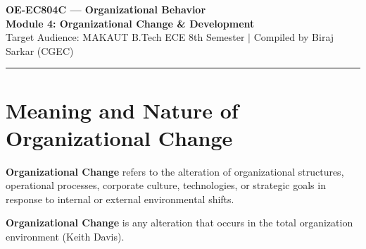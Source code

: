 \documentclass[11pt,a4paper]{article}
\begin{document}
\begin{center}
  {\LARGE \bfseries \color{myred} OE-EC804C --- Organizational Behavior}\\[6pt]
  {\Large \bfseries \color{myteal} Module 4: Organizational Change \& Development}\\[4pt]
  {\small \color{mydark} Target Audience: MAKAUT B.Tech ECE 8th Semester $|$ Compiled by Biraj Sarkar (CGEC)}
\end{center}
\vspace{-6pt}
\hrule
\vspace{10pt}

\begin{tcolorbox}[tikzbox, title={Module Contents}]
\small
\tableofcontents
\end{tcolorbox}
\vspace{10pt}

\section{Meaning and Nature of Organizational Change}

\textbf{Organizational Change} refers to the alteration of organizational structures, operational processes, corporate culture, technologies, or strategic goals in response to internal or external environmental shifts.

\begin{tcolorbox}[defbox, title={Definition of Organizational Change}]
  \textbf{Organizational Change} is any alteration that occurs in the total organization environment (Keith Davis).
\end{tcolorbox}
\end{document}
